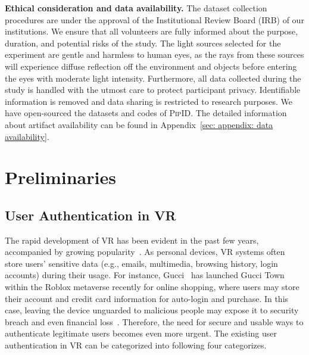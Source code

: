 \documentclass[sigconf]{acmart}
\newcommand{\sysname}{\textsc{PipID}\xspace}
\begin{document}
\noindent \textbf{Ethical consideration and data availability.} The dataset collection procedures are under the approval of the Institutional Review Board (IRB) of our institutions. We ensure that all volunteers are fully informed about the purpose, duration, and potential risks of the study. The light sources selected for the experiment are gentle and harmless to human eyes, as the rays from these sources will experience diffuse reflection off the environment and objects before entering the eyes with moderate light intensity. Furthermore, all data collected during the study is handled with the utmost care to protect participant privacy. Identifiable information is removed and data sharing is restricted to research purposes. 
We have open-sourced the datasets and codes of \sysname. The detailed information about artifact availability can be found in Appendix~\ref{sec: appendix: data availability}.


\section{Preliminaries}
\label{sec:background}

\subsection{User Authentication in VR}
The rapid development of VR has been evident in the past few years, accompanied by growing popularity~\cite{us_vr2024, vr_market}. As personal devices, VR systems often store users' sensitive data (e.g., emails, multimedia, browsing history, login accounts) during their usage. For instance, Gucci~\cite{gucci2023} has launched Gucci Town within the Roblox metaverse recently for online shopping, where users may store their account and credit card information for auto-login and purchase. In this case, leaving the device unguarded to malicious people may expose it to security breach and even financial loss~\cite{zhu2020blinkey}. Therefore, the need for secure and usable ways to authenticate legitimate users becomes even more urgent. The existing user authentication in VR can be categorized into following four categorizes.
\end{document}

